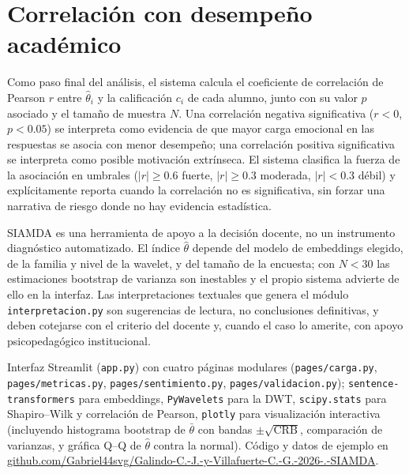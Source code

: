 \documentclass[11pt,a4paper,oneside]{article}
\theoremstyle{definition}
\begin{document}
\section{Correlación con desempeño académico}

Como paso final del análisis, el sistema calcula el coeficiente de correlación de Pearson $r$
entre $\hat\theta_i$ y la calificación $c_i$ de cada alumno, junto con su valor $p$ asociado y
el tamaño de muestra $N$. Una correlación negativa significativa ($r<0$, $p<0.05$) se interpreta
como evidencia de que mayor carga emocional en las respuestas se asocia con menor desempeño;
una correlación positiva significativa se interpreta como posible motivación extrínseca. El
sistema clasifica la fuerza de la asociación en umbrales ($|r|\ge 0.6$ fuerte, $|r|\ge 0.3$
moderada, $|r|<0.3$ débil) y explícitamente reporta cuando la correlación no es significativa,
sin forzar una narrativa de riesgo donde no hay evidencia estadística.

\begin{warningBox}
SIAMDA es una herramienta de apoyo a la decisión docente, no un instrumento diagnóstico
automatizado. El índice $\hat\theta$ depende del modelo de embeddings elegido, de la familia y
nivel de la wavelet, y del tamaño de la encuesta; con $N<30$ las estimaciones bootstrap de
varianza son inestables y el propio sistema advierte de ello en la interfaz. Las
interpretaciones textuales que genera el módulo \texttt{interpretacion.py} son sugerencias de
lectura, no conclusiones definitivas, y deben cotejarse con el criterio del docente y, cuando
el caso lo amerite, con apoyo psicopedagógico institucional.
\end{warningBox}

\begin{implBox}
Interfaz Streamlit (\texttt{app.py}) con cuatro páginas modulares
(\texttt{pages/carga.py}, \texttt{pages/metricas.py}, \texttt{pages/sentimiento.py},
\texttt{pages/validacion.py}); \texttt{sentence-transformers} para embeddings,
\texttt{PyWavelets} para la DWT, \texttt{scipy.stats} para Shapiro--Wilk y correlación de
Pearson, \texttt{plotly} para visualización interactiva (incluyendo histograma bootstrap de
$\bar\theta$ con bandas $\pm\sqrt{\mathrm{CRB}}$, comparación de varianzas, y gráfica Q--Q de
$\hat\theta$ contra la normal). Código y datos de ejemplo en
\href{https://github.com/Gabriel44svg/Galindo-C.-J.-y-Villafuerte-C.-G.-2026-.-SIAMDA}{github.com/Gabriel44svg/Galindo-C.-J.-y-Villafuerte-C.-G.-2026-.-SIAMDA}.
\end{implBox}
\end{document}
